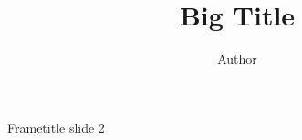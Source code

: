 \documentclass{beamer}
\title[Title]{\textbf{{\huge Big Title}}}
\author[email]{Author}
\institute[]{Department\\University}
\begin{document}
\begin{frame}{Frametitle}
slide 2
\end{frame}
\end{document}
